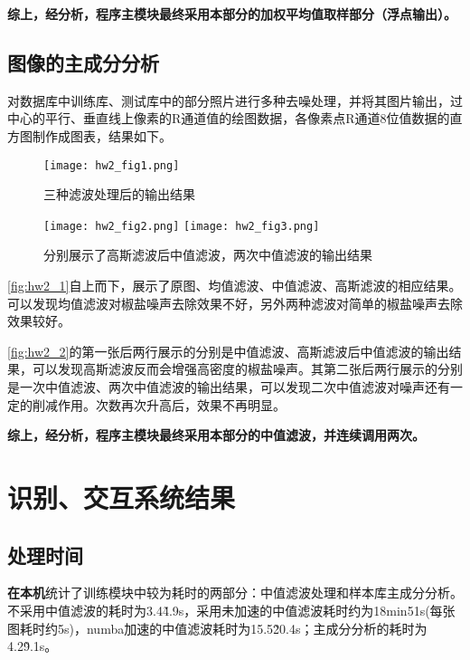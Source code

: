 \textbf{综上，经分析，程序主模块最终采用本部分的加权平均值取样部分（浮点输出）。}

\subsection{图像的主成分分析}

对数据库中训练库、测试库中的部分照片进行多种去噪处理，并将其图片输出，过中心的平行、垂直线上像素的R通道值的绘图数据，各像素点R通道8位值数据的直方图制作成图表，结果如下。

\begin{figure}[H]
    \centering
    \texttt{[image: hw2\_fig1.png]}
    \caption{三种滤波处理后的输出结果}
    \label{fig:hw2_1}
\end{figure}

\begin{figure}[H]
    \centering
    \texttt{[image: hw2\_fig2.png]}
    \texttt{[image: hw2\_fig3.png]}
    \caption{分别展示了高斯滤波后中值滤波，两次中值滤波的输出结果}
    \label{fig:hw2_2}
\end{figure}

\autoref{fig:hw2_1}自上而下，展示了原图、均值滤波、中值滤波、高斯滤波的相应结果。可以发现均值滤波对椒盐噪声去除效果不好，另外两种滤波对简单的椒盐噪声去除效果较好。

\autoref{fig:hw2_2}的第一张后两行展示的分别是中值滤波、高斯滤波后中值滤波的输出结果，可以发现高斯滤波反而会增强高密度的椒盐噪声。其第二张后两行展示的分别是一次中值滤波、两次中值滤波的输出结果，可以发现二次中值滤波对噪声还有一定的削减作用。次数再次升高后，效果不再明显。

\textbf{综上，经分析，程序主模块最终采用本部分的中值滤波，并连续调用两次。}

\section{识别、交互系统结果}

\subsection{处理时间}
\label{sec:pca0}

\textbf{在本机}统计了训练模块中较为耗时的两部分：中值滤波处理和样本库主成分分析。不采用中值滤波的耗时为3.4\~4.9s，采用未加速的中值滤波耗时约为18min51s(每张图耗时约5s)，numba加速的中值滤波耗时为15.5\~20.4s；主成分分析的耗时为4.2\~9.1s。

